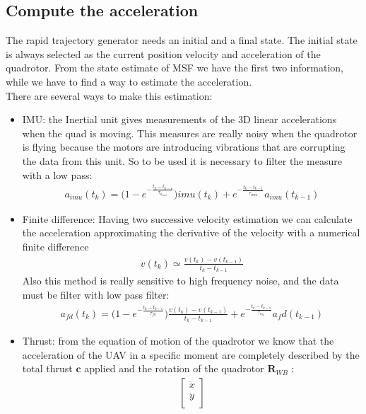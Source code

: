 \subsection{Compute the acceleration} \label{subsec:acceleration}
The rapid trajectory generator needs an initial and a final state. The initial state is always selected as the current position velocity and acceleration of the quadrotor. From the state estimate of MSF we have the first two information, while we have to find a way to estimate the acceleration.\\
There are several ways to make this estimation:
\begin{itemize}
\item IMU: the Inertial unit gives measurements of the 3D linear accelerations when the quad is moving. This measures are really noisy when the quadrotor is flying because the motors are introducing vibrations that are corrupting the data from this unit. So to be used it is necessary to filter the measure with a low pass:
 \begin{align}
a_{imu}(t_k) = \Big(1-e^{-\frac{t_k-t_{k-1}}{\tau_{a_{imu}}}}\Big)imu(t_k) + e^{-\frac{t_k-t_{k-1}}{\tau_{imu}}} a_{imu}(t_{k-1})
\label{eq:imu_acc}
\end{align}
\item Finite difference: Having two successive velocity estimation we can calculate the acceleration approximating the derivative of the velocity with a numerical finite difference
\begin{align}
\dot{v}(t_k) \simeq \frac{v(t_k)-v(t_{k-1})}{t_k-t_{k-1}}
\label{eq:finite_difference}
\end{align}
Also this method is really sensitive to high frequency noise, and the data must be filter with low pass filter:
 \begin{align}
a_{fd}(t_k) =  \Big(1-e^{-\frac{t_k-t_{k-1}}{\tau_{fd}}}\Big)\frac{v(t_k)-v(t_{k-1})}{t_k-t_{k-1}} + e^{-\frac{t_k-t_{k-1}}{\tau_{a_{fd}}}} a_fd(t_{k-1})
\label{eq:finite_difference}
\end{align}
\item Thrust: from the equation of motion of the quadrotor we know that the acceleration of the UAV in a specific moment are completely described by the total thrust $\boldsymbol{c}$ applied and the rotation of the quadrotor $\boldsymbol{R}_{WB}$ :
\begin{align}
{\begin{bmatrix}
\ddot{x} \\[10pt]
\ddot{y} \\[10pt]

\end{bmatrix}}
\end{align}
\end{itemize}
